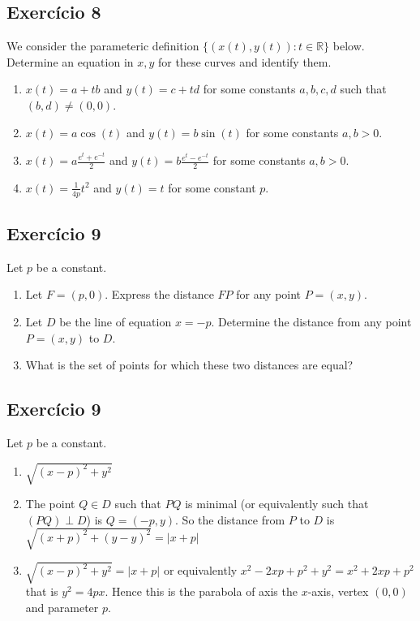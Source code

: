\subsection*{Exercício 8}

We consider the parameteric definition
$\{ (x(t), y(t)) : t \in \mathbb R \}$ below. Determine an equation in $x,y$
for these curves and identify them.

\begin{enumerate}
\item $x(t) = a + t b$ and $y(t) = c + t d$ for some constants $a,b,c,d$
  such that $(b,d) \neq (0,0)$.
\item $x(t) = a\cos{(t)}$ and $y(t) = b\sin{(t)}$ for some
  constants $a,b > 0$.
\item $x(t) = a \frac{e^t+e^{-t}}{2}$ and $y(t)= b \frac{e^t-e^{-t}}{2}$
  for some constants $a,b > 0$.
\item $x(t) = \frac{1}{4p}t^2$ and $y(t) = t$ for some constant $p$.
\end{enumerate}

\subsection*{Exercício 9}

Let $p$ be a constant.

\begin{enumerate}
\item Let $F=(p,0)$. Express the distance $FP$ for any point $P=(x,y)$.
\item Let $D$ be the line of equation $x = -p$. Determine the distance from
  any point $P=(x,y)$ to $D$.
\item What is the set of points for which these two distances are equal?
\end{enumerate}

\subsection*{Exercício 9}

Let $p$ be a constant.

\begin{enumerate}
\item $\sqrt{{(x-p)}^2+y^2}$
\item The point $Q \in D$ such that $PQ$ is minimal (or equivalently such
  that $(PQ) \perp D$) is $Q=(-p,y)$.
  So the distance from $P$ to $D$ is $\sqrt{{(x+p)}^2+{(y-y)}^2} = {|x+p|}$
\item $\sqrt{{(x-p)}^2+y^2} = |x+p|$ or equivalently
  $x^2-2xp+p^2+y^2=x^2+2xp+p^2$ that is
  $y^2=4px$. Hence this is the parabola of axis the $x$-axis, vertex $(0,0)$
  and parameter $p$.
\end{enumerate}

